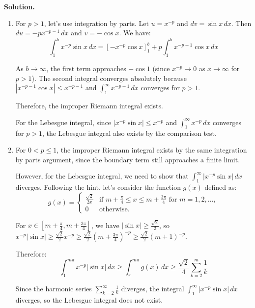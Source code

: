 \noindent\textbf{Solution.}
\begin{enumerate}[label=(\alph*)]
    \item For $p > 1$, let's use integration by parts. Let $u = x^{-p}$ and $dv = \sin x \, dx$. Then $du = -px^{-p-1} \, dx$ and $v = -\cos x$. We have:
    \[\int_1^b x^{-p} \sin x \, dx = \left[-x^{-p} \cos x\right]_1^b + p \int_1^b x^{-p-1} \cos x \, dx\]
    
    As $b \to \infty$, the first term approaches $-\cos 1$ (since $x^{-p} \to 0$ as $x \to \infty$ for $p > 1$). The second integral converges absolutely because $|x^{-p-1} \cos x| \leq x^{-p-1}$ and $\int_1^\infty x^{-p-1} \, dx$ converges for $p > 1$.
    
    Therefore, the improper Riemann integral exists.
    
    For the Lebesgue integral, since $|x^{-p} \sin x| \leq x^{-p}$ and $\int_1^\infty x^{-p} \, dx$ converges for $p > 1$, the Lebesgue integral also exists by the comparison test.
    
    \item For $0 < p \leq 1$, the improper Riemann integral exists by the same integration by parts argument, since the boundary term still approaches a finite limit.
    
    However, for the Lebesgue integral, we need to show that $\int_1^\infty |x^{-p} \sin x| \, dx$ diverges. Following the hint, let's consider the function $g(x)$ defined as:
    \[g(x) = 
    \begin{cases} 
    \frac{\sqrt{2}}{2x} & \text{if } m + \frac{\pi}{4} \leq x \leq m + \frac{3\pi}{4} \text{ for } m = 1, 2, \ldots, \\ 
    0 & \text{otherwise}.
    \end{cases}\]
    
    For $x \in [m + \frac{\pi}{4}, m + \frac{3\pi}{4}]$, we have $|\sin x| \geq \frac{\sqrt{2}}{2}$, so $x^{-p} |\sin x| \geq \frac{\sqrt{2}}{2} x^{-p} \geq \frac{\sqrt{2}}{2} (m + \frac{3\pi}{4})^{-p} \geq \frac{\sqrt{2}}{2} (m + 1)^{-p}$.
    
    Therefore:
    \[\int_{1}^{m\pi} x^{-p} |\sin x| \, dx \geq \int_{\pi}^{m\pi} g(x) \, dx \geq \frac{\sqrt{2}}{4} \sum_{k=2}^{m} \frac{1}{k}\]
    
    Since the harmonic series $\sum_{k=2}^{\infty} \frac{1}{k}$ diverges, the integral $\int_1^\infty |x^{-p} \sin x| \, dx$ diverges, so the Lebesgue integral does not exist.
\end{enumerate}


